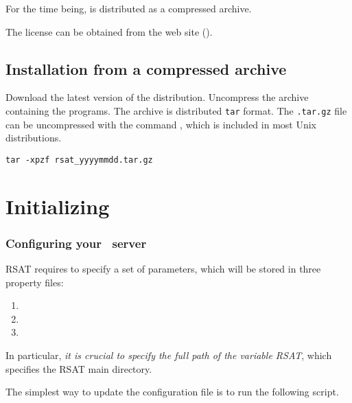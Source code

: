 \documentclass[12pt,a4paper, oneside]{scrreprt} %
\begin{document}
For the time being, \RSAT is distributed as a compressed archive. 

The license can be obtained from the \RSAT web site (\rsaturl).

\section{Installation from a compressed archive}

Download the latest version of the \RSAT distribution. Uncompress the
archive containing the programs. The archive is distributed
\texttt{tar} format. The \texttt{.tar.gz} file can be uncompressed
with the command , which is included in most Unix
distributions.

\begin{lstlisting}
tar -xpzf rsat_yyyymmdd.tar.gz
\end{lstlisting}



\chapter{Initializing \RSAT}

% 

\subsection{Configuring your \RSAT\ server}

RSAT requires to specify a set of parameters, which will be stored in
three property files:
\begin{enumerate}
\item  {}
\item  {}
\item  {}
\end{enumerate}

In particular, \emph{it is crucial to specify the full path of the
  variable RSAT}, which specifies the RSAT main directory.

The simplest way to update the configuration file is to run the
following script.
\end{document}
